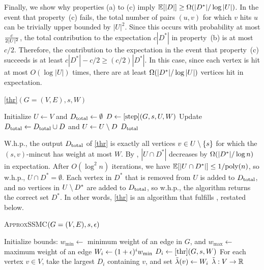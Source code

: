 Finally, we show why properties (a) to (c) imply $\mathbb E[|D|] \ge \Omega(|D^*|/\log|U|)$. In the event that property~(c) fails, the total number of pairs $(u,v)$ for which $v$ hits $u$ can be trivially upper bounded by $|U|^2$. Since this occurs with probability at most $\frac c{2|U|^2}$, the total contribution to the expectation $c|D^*|$ in property~(b) is at most $c/2$. Therefore, the contribution to the expectation in the event that property~(c) succeeds is at least $c|D^*|-c/2\ge (c/2)|D^*|$. In this case, since each vertex is hit at most $O(\log|U|)$ times, there are at least $\Omega(|D^*|/\log|U|)$ vertices hit in expectation.
\EP


\begin{algorithm}
\caption{\ref{thr}$(G=(V,E),s, W)$}
\begin{algorithmic}[1]
\State Initialize $U\gets V$ and $D_{\textup{total}}\gets\emptyset$
 \State $D\gets \ref{step}(G,s,U, W)$
 \State Update $D_{\textup{total}}\gets D_{\textup{total}}\cup D$ and $U\gets U\setminus D$
\EndFor
\State\Return $D_{\textup{total}}$
\end{algorithmic}
\end{algorithm}


\BC{}
W.h.p., the output $D_{\textup{total}}$ of \ref{thr} is exactly all vertices $v\in U\setminus \{s\}$ for which the $(s,v)$-mincut has weight at most $ W$. 
\EC
\BP
By , $|U\cap D^*|$ decreases by $\Omega(|D^*|/\log n)$ in expectation. After $O(\log^2n)$ iterations, we have $\mathbb E[|U\cap D^*|] \le 1/\textup{poly}(n)$, so w.h.p., $U\cap D^*=\emptyset$. Each vertex in $D^*$ that is removed from $U$ is added to $D_{\textup{total}}$, and no vertices in $U\setminus D^*$ are added to $D_{\textup{total}}$, so w.h.p., the algorithm returns the correct set $D^*$.
\EP
In other words, \ref{thr} is an algorithm that fulfills , restated below.
\Thr*

\begin{algorithm}
\caption{\textsc{ApproxSSMC}$(G=(V,E),s,\epsilon)$}
\begin{algorithmic}[1]
 \State Initialize bounds: $ w_{\min} \gets$ minimum weight of an edge in $G$, and $ w_{\max}\gets$ maximum weight of an edge %
 \State $ W_i\gets (1+\epsilon)^i w_{\min}$
 \State $D_i\gets \ref{thr}(G,s, W)$
\EndFor
\State For each vertex $v\in V$, take the largest $D_i$ containing $v$, and set $\tilde{\lambda}(v)\gets  W_i$
\State\Return $\tilde{\lambda}:V\to \mathbb R$
\end{algorithmic}
\end{algorithm}

